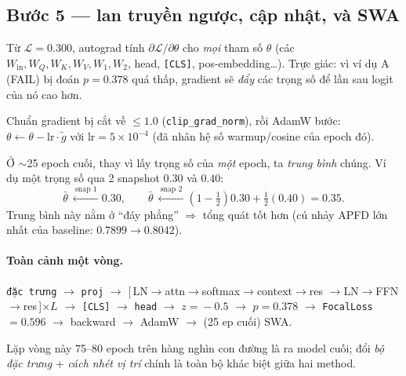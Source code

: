 \documentclass[11pt]{article}
\newcommand{\code}[1]{\textcolor{cInk}{\texttt{#1}}}
\theoremstyle{definition}
\begin{document}
\subsection{Bước 5 --- lan truyền ngược, cập nhật, và SWA}
\label{sec:trace-backward}
\begin{description}[leftmargin=0em,style=nextline]
\item[Backward] Từ $\mathcal{L}=0.300$, autograd tính $\partial\mathcal{L}/
\partial\theta$ cho \emph{mọi} tham số $\theta$ (các $W_{\text{in}},W_Q,W_K,W_V,
W_1,W_2$, head, \code{[CLS]}, pos-embedding\dots). Trực giác: vì ví dụ A (FAIL) bị
đoán $p{=}0.378$ quá thấp, gradient sẽ \emph{đẩy} các trọng số để lần sau logit
của nó cao hơn.
\item[Clip \& step] Chuẩn gradient bị cắt về $\le 1.0$ (\code{clip\_grad\_norm}),
rồi AdamW bước: $\theta\leftarrow\theta-\text{lr}\cdot\widetilde{g}$ với
$\text{lr}=5{\times}10^{-4}$ (đã nhân hệ số warmup/cosine của epoch đó).
\item[SWA] Ở $\sim$25 epoch cuối, thay vì lấy trọng số của \emph{một} epoch, ta
\emph{trung bình} chúng. Ví dụ một trọng số qua 2 snapshot $0.30$ và $0.40$:
\[
\bar\theta\ \xleftarrow{\ \text{snap 1}\ }0.30,\qquad
\bar\theta\ \xleftarrow{\ \text{snap 2}\ }(1-\tfrac12)0.30+\tfrac12(0.40)=0.35.
\]
Trung bình này nằm ở ``đáy phẳng'' $\Rightarrow$ tổng quát tốt hơn (cú nhảy APFD
lớn nhất của baseline: $0.7899\!\to\!0.8042$).
\end{description}

\paragraph{Toàn cảnh một vòng.}
\begin{center}\small
\code{đặc trưng} $\to$ \code{proj} $\to$ [\,LN$\to$attn$\to$softmax$\to$context$\to$res
$\to$LN$\to$FFN$\to$res\,]$\times L$ $\to$ \code{[CLS]} $\to$ \code{head} $\to$
$z\!=\!-0.5$ $\to$ $p\!=\!0.378$ $\to$ \code{FocalLoss}$=0.596$ $\to$ backward
$\to$ AdamW $\to$ (25 ep cuối) SWA.
\end{center}
Lặp vòng này 75--80 epoch trên hàng nghìn con đường là ra model cuối; đổi
\emph{bộ đặc trưng} + \emph{cách nhét vị trí} chính là toàn bộ khác biệt giữa hai
method.

\end{document}
